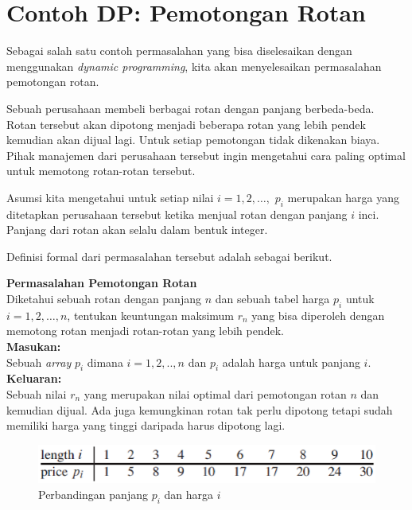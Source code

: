 \section{Contoh DP: Pemotongan Rotan}
Sebagai salah satu contoh permasalahan yang bisa diselesaikan dengan menggunakan \textit{dynamic programming}, kita akan menyelesaikan permasalahan pemotongan rotan. 

Sebuah perusahaan membeli berbagai rotan dengan panjang berbeda-beda. Rotan tersebut akan dipotong menjadi beberapa rotan yang lebih pendek kemudian akan dijual lagi. Untuk setiap pemotongan tidak dikenakan biaya. Pihak manajemen dari perusahaan tersebut ingin mengetahui cara paling optimal untuk memotong rotan-rotan tersebut.

Asumsi kita mengetahui untuk setiap nilai $i=1,2,\ldots,$ $p_i$ merupakan harga yang ditetapkan perusahaan tersebut ketika menjual rotan dengan panjang $i$ inci. Panjang dari rotan akan selalu dalam bentuk integer. 

Definisi formal dari permasalahan tersebut adalah sebagai berikut.

\begin{contoh}
\textbf{Permasalahan Pemotongan Rotan}\\
Diketahui sebuah rotan dengan panjang $n$ dan sebuah tabel harga $p_i$ untuk $i=1,2,\ldots,n$, tentukan keuntungan maksimum $r_n$ yang bisa diperoleh dengan memotong rotan menjadi rotan-rotan yang lebih pendek. \\
\textbf{Masukan:}\\
Sebuah \textit{array} $p_i$ dimana $i=1,2,..,n$ dan $p_i$ adalah harga untuk panjang $i$.\\
\textbf{Keluaran:}\\
Sebuah nilai $r_n$ yang merupakan nilai optimal dari pemotongan rotan $n$ dan kemudian dijual. Ada juga kemungkinan rotan tak perlu dipotong tetapi sudah memiliki harga yang tinggi daripada harus dipotong lagi.\\
\end{contoh}

\begin{figure}[H]%
\centering
\includegraphics[scale=0.6]{fig/rodCutting.eps}%
\caption{Perbandingan panjang $p_i$ dan harga $i$}%
\label{fig:rodCutting}%
\end{figure}

